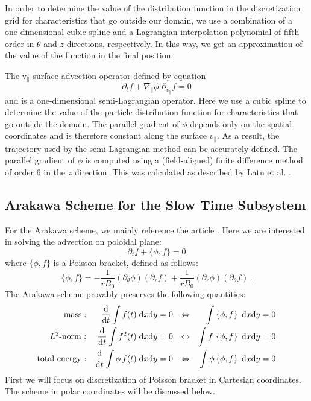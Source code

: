 In order to determine the value of the distribution function in the discretization grid for characteristics that go outside our domain, we use a combination of a one-dimensional cubic spline and a Lagrangian interpolation polynomial of fifth order in $\theta$ and $z$ directions, respectively. In this way, we get an approximation of the value of the function in the final position.

The v$_\parallel$ surface advection operator defined by equation
\begin{equation}
    \partial_t f + \nabla_\parallel \phi\,\, \partial_{v_{\parallel}} f = 0
\end{equation}
and is a one-dimensional semi-Lagrangian operator. Here we use a cubic spline to determine the value of the particle distribution function for characteristics that go outside the domain. The parallel gradient of $\phi$ depends only on the spatial coordinates and is therefore constant along the surface $v_\parallel$. As a result, the trajectory used by the semi-Lagrangian method can be accurately defined. The parallel gradient of $\phi$ is computed using a (field-aligned) finite difference method of order 6 in the $z$ direction. This was calculated as described by Latu et al. \cite{Latu_2017}.







\subsection{Arakawa Scheme for the Slow Time Subsystem}

For the Arakawa scheme, we mainly reference the article \cite{Arakawa_1966}. Here we are interested in solving the advection on poloidal plane:
\begin{equation}
 \partial_t f + \{\phi, f\} = 0
\end{equation}
where $\{\phi,f\}$ is a Poisson bracket, defined as follows:
\begin{equation}\label{eq:poisson_bracket}
	 \{\phi,f\} = - \frac{1}{rB_0} \left(\partial_\theta\phi\right) \left(\partial_r f\right) + \frac{1}{rB_0} \left(\partial_r\phi\right) \left(\partial_\theta f\right) \, .
\end{equation}
The Arakawa scheme provably preserves the following quantities:
	\begin{align}\label{conservation-properties}
		\text{mass} : && \frac{\text{d}}{\text{d} t} \int f(t) \;\text{d} x \text{d} y & = 0 & \Leftrightarrow && \int\left\{ \phi, f \right\} \;\text{d} x \text{d} y & = 0\\
		L^2\text{-norm :} && \frac{\text{d}}{\text{d} t} \int f^2(t) \;\text{d} x \text{d} y & = 0 & \Leftrightarrow && \int f \, \left\{ \phi, f \right\} \;\text{d} x \text{d} y & = 0\\
		\text{total energy :} && \frac{\text{d}}{\text{d} t} \int \phi \, f(t) \;\text{d} x \text{d} y & = 0 & \Leftrightarrow && \int \phi \left\{ \phi, f \right\} \;\text{d} x \text{d} y & = 0
	\end{align}
First we will focus on discretization of Poisson bracket in Cartesian coordinates. The scheme in polar coordinates will be discussed below.







